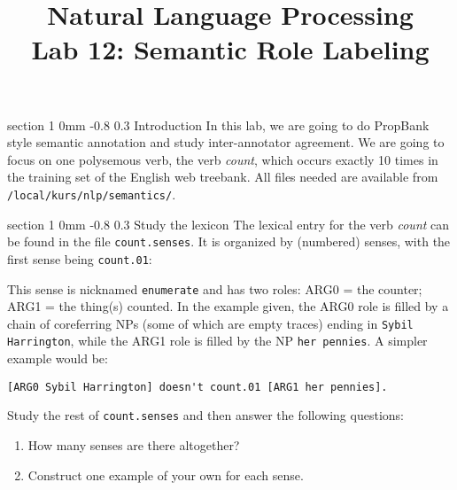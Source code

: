 \documentclass[11pt]{article}
\title{{\LARGE Natural Language Processing}\\[1.5mm]{\large Lab 12: Semantic Role Labeling}}
\author{}
\date{} %
\makeatletter
\newcommand{\newsec}[2]{\section{#1}\label{sec:#2}\noindent}
\renewcommand{\section}{\@startsection
{section}%
{1}%
{0mm}%
{-0.8\baselineskip}%
{0.3\baselineskip}%
{\bfseries\large}}%
\makeatother
\begin{document}
 

\maketitle
\vspace{-2mm} \newsec{Introduction}{intro}%
In this lab, we are going to do PropBank style semantic
annotation and study inter-annotator agreement. We are going to focus
on one polysemous verb, the verb {\em count}, which occurs exactly 10
times in the training set of the English web treebank. All files
needed are available from {\tt /local/kurs/nlp/semantics/}.


\newsec{Study the lexicon }{lex}%
The lexical entry for the verb {\em count} can be found in the file
{\tt count.senses}. It is organized by (numbered) senses, with the
first sense being {\tt count.01}:

 This sense is nicknamed {\tt enumerate} and has
two roles: ARG0 = the counter; ARG1 = the thing(s) counted.  In the
example given, the ARG0 role is filled by a chain of coreferring NPs
(some of which are empty traces) ending in {\tt Sybil Harrington},
while the ARG1 role is filled by the NP {\tt her pennies}. A simpler
example would be:
\begin{Verbatim}[fontsize=\small,xleftmargin=\parindent]
[ARG0 Sybil Harrington] doesn't count.01 [ARG1 her pennies].
\end{Verbatim}
Study the rest of {\tt count.senses} and then answer the following
questions:
\begin{enumerate}[noitemsep,topsep=0.2cm]
\item  How many senses are there altogether?
\item  Construct one example of your own for each sense.
\end{enumerate}
\end{document}

